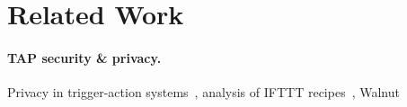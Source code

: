 \section{Related Work}
\label{sec:related}

\paragraph{TAP security \& privacy.}
Privacy in trigger-action systems~\cite{DBLP:conf/sp/ChenCWSCF21}, analysis of
IFTTT recipes~\cite{DBLP:conf/chi/UrHBLMPSL16,DBLP:conf/www/SurbatovichABDJ17},
Walnut~\cite{DBLP:journals/corr/abs-2009-12447}
